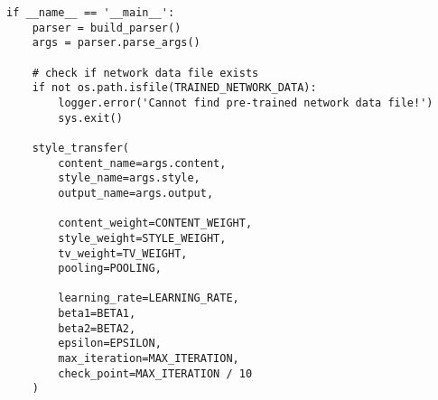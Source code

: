 \begin{spacing}{1.2}
\begin{lstlisting}
if __name__ == '__main__':
    parser = build_parser()
    args = parser.parse_args()

    # check if network data file exists
    if not os.path.isfile(TRAINED_NETWORK_DATA):
        logger.error('Cannot find pre-trained network data file!')
        sys.exit()

    style_transfer(
        content_name=args.content,
        style_name=args.style,
        output_name=args.output,

        content_weight=CONTENT_WEIGHT,
        style_weight=STYLE_WEIGHT,
        tv_weight=TV_WEIGHT,
        pooling=POOLING,

        learning_rate=LEARNING_RATE,
        beta1=BETA1,
        beta2=BETA2,
        epsilon=EPSILON,
        max_iteration=MAX_ITERATION,
        check_point=MAX_ITERATION / 10
    )

\end{lstlisting}
\end{spacing}



